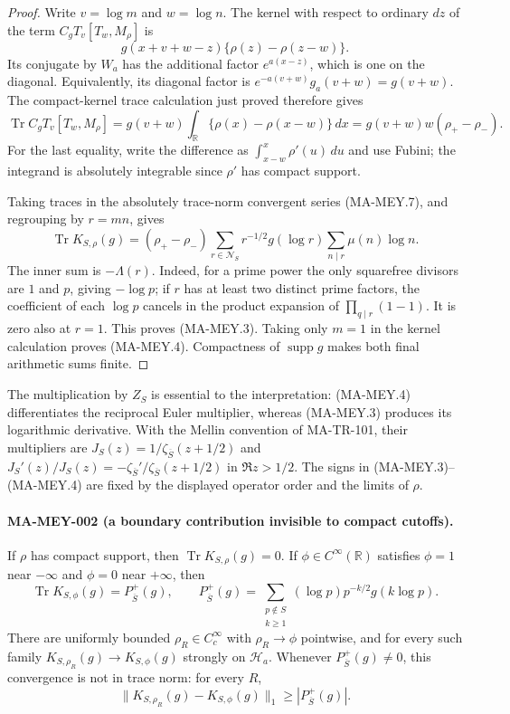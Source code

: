 \begin{proof}
Write $v=\log m$ and $w=\log n$.  The kernel with respect to
ordinary $dz$ of the term $C_gT_v[T_w,M_\rho]$ is
\[
     g(x+v+w-z)\{\rho(z)-\rho(z-w)\}.
 \tag{MA-MEY.8}
\]
Its conjugate by $W_a$ has the additional factor $e^{a(x-z)}$,
which is one on the diagonal.  Equivalently, its diagonal
factor is $e^{-a(v+w)}g_a(v+w)=g(v+w)$.  The compact-kernel
trace calculation just proved therefore gives
\[
 \operatorname{Tr} C_gT_v[T_w,M_\rho]
   =g(v+w)\int_{\mathbb R}\{\rho(x)-\rho(x-w)\}\,dx
   =g(v+w)w(\rho_+-\rho_-).
 \tag{MA-MEY.9}
\]
For the last equality, write the difference as
$\int_{x-w}^x\rho'(u)\,du$ and use Fubini; the integrand is
absolutely integrable since $\rho'$ has compact support.

Taking traces in the absolutely trace-norm convergent series
(MA-MEY.7), and regrouping by $r=mn$, gives
\[
 \operatorname{Tr}K_{S,\rho}(g)
 = (\rho_+-\rho_-)
   \sum_{r\in\mathcal N_S}r^{-1/2}g(\log r)
              \sum_{n\mid r}\mu(n)\log n.
\]
The inner sum is $-\Lambda(r)$.  Indeed, for a prime power the
only squarefree divisors are $1$ and $p$, giving $-\log p$;
if $r$ has at least two distinct prime factors, the coefficient
of each $\log p$ cancels in the product expansion of
$\prod_{q\mid r}(1-1)$.  It is zero also at $r=1$.
This proves (MA-MEY.3).  Taking only $m=1$ in the kernel
calculation proves (MA-MEY.4).  Compactness of
$\operatorname{supp}g$ makes both final arithmetic sums finite.
\end{proof}

The multiplication by $Z_S$ is essential to the interpretation:
(MA-MEY.4) differentiates the reciprocal Euler multiplier,
whereas (MA-MEY.3) produces its logarithmic derivative.  With
the Mellin convention of MA-TR-101, their multipliers are
$J_S(z)=1/\zeta_{\overline S}(z+1/2)$ and
$J_S'(z)/J_S(z)=-\zeta_{\overline S}'/
\zeta_{\overline S}(z+1/2)$ in $\Re z>1/2$.
The signs in (MA-MEY.3)--(MA-MEY.4) are fixed by the displayed
operator order and the limits of $\rho$.

\paragraph{MA-MEY-002 (a boundary contribution invisible to compact cutoffs).}
If $\rho$ has compact support, then
$\operatorname{Tr}K_{S,\rho}(g)=0$.  If
$\phi\in C^\infty(\mathbb R)$ satisfies $\phi=1$ near
$-\infty$ and $\phi=0$ near $+\infty$, then
\[
 \operatorname{Tr}K_{S,\phi}(g)=P_{\overline S}^+(g),\qquad
 P_{\overline S}^+(g)=
 \sum_{\substack{p\notin S\\k\ge1}}
       (\log p)p^{-k/2}g(k\log p).
 \tag{MA-MEY.10}
\]
There are uniformly bounded $\rho_R\in C_c^\infty$ with
$\rho_R\to\phi$ pointwise, and for every such family
$K_{S,\rho_R}(g)\to K_{S,\phi}(g)$ strongly on $\mathcal H_a$.
Whenever $P_{\overline S}^+(g)\ne0$, this convergence is not in
trace norm: for every $R$,
\[
 \|K_{S,\rho_R}(g)-K_{S,\phi}(g)\|_1
       \ge |P_{\overline S}^+(g)|.
 \tag{MA-MEY.11}
\]

